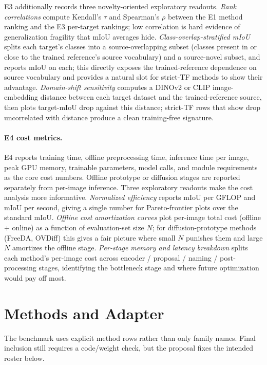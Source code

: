 \documentclass[11pt,a4paper]{article}
\begin{document}
E3 additionally records three novelty-oriented exploratory readouts. \emph{Rank correlations} compute Kendall's $\tau$ and Spearman's $\rho$ between the E1 method ranking and the E3 per-target rankings; low correlation is hard evidence of generalization fragility that mIoU averages hide. \emph{Class-overlap-stratified mIoU} splits each target's classes into a source-overlapping subset (classes present in or close to the trained reference's source vocabulary) and a source-novel subset, and reports mIoU on each; this directly exposes the trained-reference dependence on source vocabulary and provides a natural slot for strict-TF methods to show their advantage. \emph{Domain-shift sensitivity} computes a DINOv2 or CLIP image-embedding distance between each target dataset and the trained-reference source, then plots target-mIoU drop against this distance; strict-TF rows that show drop uncorrelated with distance produce a clean training-free signature.

\paragraph{E4 cost metrics.}
E4 reports training time, offline preprocessing time, inference time per image, peak GPU memory, trainable parameters, model calls, and module requirements as the core cost numbers. Offline prototype or diffusion stages are reported separately from per-image inference. Three exploratory readouts make the cost analysis more informative. \emph{Normalized efficiency} reports mIoU per GFLOP and mIoU per second, giving a single number for Pareto-frontier plots over the standard mIoU. \emph{Offline cost amortization curves} plot per-image total cost (offline + online) as a function of evaluation-set size $N$; for diffusion-prototype methods (FreeDA, OVDiff) this gives a fair picture where small $N$ punishes them and large $N$ amortizes the offline stage. \emph{Per-stage memory and latency breakdown} splits each method's per-image cost across encoder / proposal / naming / post-processing stages, identifying the bottleneck stage and where future optimization would pay off most.

\section{Methods and Adapter}

The benchmark uses explicit method rows rather than only family names. Final inclusion still requires a code/weight check, but the proposal fixes the intended roster below.
\end{document}
